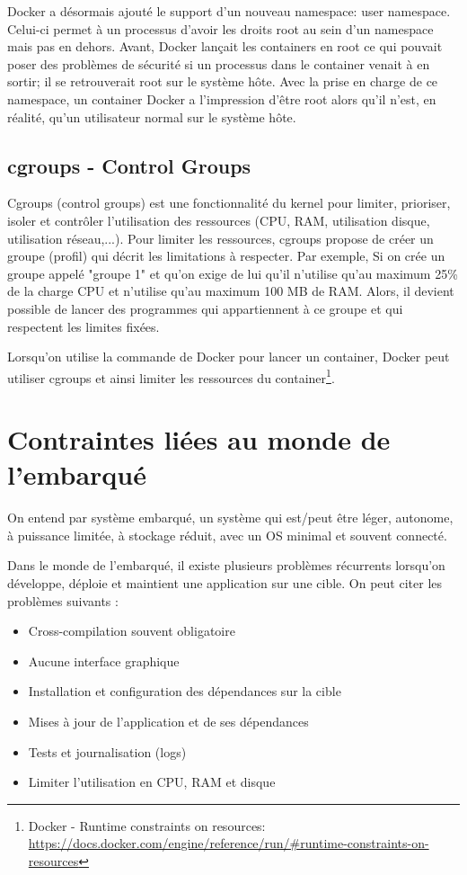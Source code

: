 Docker a désormais ajouté le support d'un nouveau namespace: user namespace. Celui-ci permet à un processus d'avoir les droits root au sein d'un namespace mais pas en dehors. Avant, Docker lançait les containers en root ce qui pouvait poser des problèmes de sécurité si un processus dans le container venait à en sortir; il se retrouverait root sur le système hôte. Avec la prise en charge de ce namespace, un container Docker a l'impression d'être root alors qu'il n'est, en réalité, qu'un utilisateur normal sur le système hôte.

\subsection{cgroups - Control Groups}
Cgroups (control groups) est une fonctionnalité du kernel pour limiter, prioriser, isoler et contrôler l'utilisation des ressources (CPU, RAM, utilisation disque, utilisation réseau,...). Pour limiter les ressources, cgroups propose de créer un groupe (profil) qui décrit les limitations à respecter. Par exemple, Si on crée un groupe appelé "groupe 1" et qu'on exige de lui qu'il n'utilise qu'au maximum 25\% de la charge CPU et n'utilise qu'au maximum 100 MB de RAM. Alors, il devient possible de lancer des programmes qui appartiennent à ce groupe et qui respectent les limites fixées.

Lorsqu'on utilise la commande  de Docker pour lancer un container, Docker peut utiliser cgroups et ainsi limiter les ressources du container\footnote{Docker - Runtime constraints on resources: \url{https://docs.docker.com/engine/reference/run/\#runtime-constraints-on-resources}}.

\section{Contraintes liées au monde de l'embarqué}
On entend par système embarqué, un système qui est/peut être léger, autonome, à puissance limitée, à stockage réduit, avec un OS minimal et souvent connecté.

Dans le monde de l'embarqué, il existe plusieurs problèmes récurrents lorsqu'on développe, déploie et maintient une application sur une cible. On peut citer les problèmes suivants :

\begin{itemize}
\item Cross-compilation souvent obligatoire
\item Aucune interface graphique
\item Installation et configuration des dépendances sur la cible
\item Mises à jour de l'application et de ses dépendances
\item Tests et journalisation (logs)
\item Limiter l'utilisation en CPU, RAM et disque
\end{itemize}

